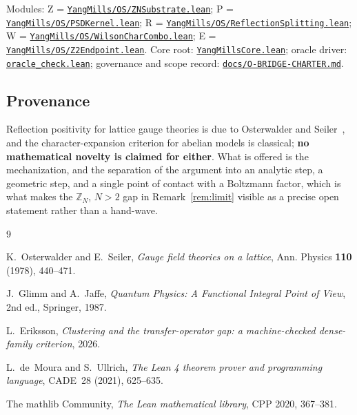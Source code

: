 \documentclass[11pt]{article}
\theoremstyle{definition}
\newcommand{\anchor}{bbadf68cb9d2433e2e3f88f910e7240acb6ae21d}
\newcommand{\osfile}[2]{%
  \href{https://github.com/lluiseriksson/THE-ERIKSSON-PROGRAMME/blob/\anchor/YangMills/OS/#1.lean}{\nolinkurl{#2}}}
\newcommand{\repofile}[2]{%
  \href{https://github.com/lluiseriksson/THE-ERIKSSON-PROGRAMME/blob/\anchor/#1}{\nolinkurl{#2}}}
\newcommand{\Z}{\mathbb{Z}}
\begin{document}
Modules: Z = \osfile{ZNSubstrate}{YangMills/OS/ZNSubstrate.lean};
P = \osfile{PSDKernel}{YangMills/OS/PSDKernel.lean};
R = \osfile{ReflectionSplitting}{YangMills/OS/ReflectionSplitting.lean};
W = \osfile{WilsonCharCombo}{YangMills/OS/WilsonCharCombo.lean};
E = \osfile{Z2Endpoint}{YangMills/OS/Z2Endpoint.lean}.
Core root: \repofile{YangMillsCore.lean}{YangMillsCore.lean}; oracle driver:
\repofile{oracle\_check.lean}{oracle\_check.lean}; governance and scope record:
\repofile{docs/O-BRIDGE-CHARTER.md}{docs/O-BRIDGE-CHARTER.md}.

\subsection*{Provenance}

Reflection positivity for lattice gauge theories is due to Osterwalder and
Seiler~\cite{OsterwalderSeiler}, and the character-expansion criterion for
abelian models is classical; \textbf{no mathematical novelty is claimed for
either}.  What is offered is the mechanization, and the separation of the
argument into an analytic step, a geometric step, and a single point of
contact with a Boltzmann factor, which is what makes the $\Z_N$, $N>2$ gap in
Remark~\ref{rem:limit} visible as a precise open statement rather than a
hand-wave.

\begin{thebibliography}{9}

K.~Osterwalder and E.~Seiler,
\emph{Gauge field theories on a lattice},
Ann. Physics \textbf{110} (1978), 440--471.

J.~Glimm and A.~Jaffe,
\emph{Quantum Physics: A Functional Integral Point of View},
2nd ed., Springer, 1987.

L.~Eriksson,
\emph{Clustering and the transfer-operator gap: a machine-checked
dense-family criterion}, 2026.

L.~de~Moura and S.~Ullrich,
\emph{The Lean 4 theorem prover and programming language},
CADE~28 (2021), 625--635.

The mathlib Community,
\emph{The Lean mathematical library},
CPP 2020, 367--381.

\end{thebibliography}
\end{document}

